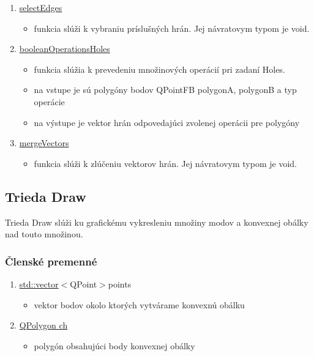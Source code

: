 \documentclass[12pt]{article}
\begin{document}
\begin{enumerate}
\item[] \underline{selectEdges}
\begin{itemize}
\item funkcia slúži k vybraniu príslušných hrán. Jej návratovym typom je void. 
\end{itemize}


\item[] \underline{booleanOperationsHoles}
\begin{itemize}
\item funkcia slúžia k prevedeniu množinových operácií pri zadaní Holes. 
\item na vstupe je sú polygóny bodov QPointFB polygonA, polygonB a typ operácie 
\item na výstupe je vektor hrán odpovedajúci zvolenej operácii pre polygóny
\end{itemize}


\item[] \underline{mergeVectors}
\begin{itemize}
\item funkcia slúži k zlúčeniu vektorov hrán. Jej návratovym typom je void. 
\end{itemize}
\end{enumerate}

\subsection{Trieda Draw}
Trieda Draw slúži ku grafickému vykresleniu množiny modov a konvexnej obálky nad touto množinou.

\subsubsection{Členské premenné}
\begin{enumerate}

\item[] \underline {std::vector}$<${QPoint}$>${points}
\begin{itemize}
\item vektor bodov okolo ktorých vytvárame konvexnú obálku
\end{itemize}
\item[] \underline {QPolygon ch}
\begin{itemize}
\item polygón obsahujúci body konvexnej obálky
\end{itemize}
\end{enumerate}
\end{document}
